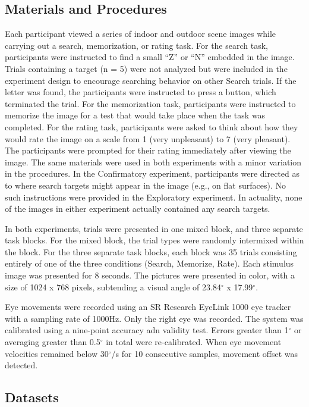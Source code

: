 \documentclass[
  english,
  man,floatsintext]{apa6}
\begin{document}
\subsection{Materials and Procedures}

Each participant viewed a series of indoor and outdoor scene images while carrying out a search, memorization, or rating task. For the search task, participants were instructed to find a small \enquote{Z} or \enquote{N} embedded in the image. Trials containing a target (n = 5) were not analyzed but were included in the experiment design to encourage searching behavior on other Search trials. If the letter was found, the participants were instructed to press a button, which terminated the trial. For the memorization task, participants were instructed to memorize the image for a test that would take place when the task was completed. For the rating task, participants were asked to think about how they would rate the image on a scale from 1 (very unpleasant) to 7 (very pleasant). The participants were prompted for their rating immediately after viewing the image. The same materials were used in both experiments with a minor variation in the procedures. In the Confirmatory experiment, participants were directed as to where search targets might appear in the image (e.g., on flat surfaces). No such instructions were provided in the Exploratory experiment. In actuality, none of the images in either experiment actually contained any search targets.

In both experiments, trials were presented in one mixed block, and three separate task blocks. For the mixed block, the trial types were randomly intermixed within the block. For the three separate task blocks, each block was 35 trials consisting entirely of one of the three conditions (Search, Memorize, Rate). Each stimulus image was presented for 8 seconds. The pictures were presented in color, with a size of 1024 x 768 pixels, subtending a visual angle of 23.84\(^{\circ}\) x 17.99\(^{\circ}\).

Eye movements were recorded using an SR Research EyeLink 1000 eye tracker with a sampling rate of 1000Hz. Only the right eye was recorded. The system was calibrated using a nine-point accuracy adn validity test. Errors greater than 1\(^{\circ}\) or averaging greater than 0.5\(^{\circ}\) in total were re-calibrated. When eye movement velocities remained below 30\(^{\circ}\)/s for 10 consecutive samples, movement offset was detected.

\subsection{Datasets}
\end{document}
